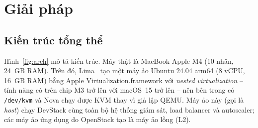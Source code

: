 \documentclass[runningheads]{llncs}
\newcommand{\code}[1]{\texttt{#1}}
\begin{document}
\section{Giải pháp}

\subsection{Kiến trúc tổng thể}

Hình~\ref{fig:arch} mô tả kiến trúc. Máy thật là MacBook Apple M4 (10 nhân, 24~GB RAM). Trên đó, Lima~\cite{lima} tạo một máy ảo Ubuntu 24.04 arm64 (8 vCPU, 16~GB RAM) bằng Apple Virtualization.framework với \emph{nested virtualization} – tính năng có trên chip M3 trở lên với macOS~15 trở lên – nên bên trong có \code{/dev/kvm} và Nova chạy được KVM thay vì giả lập QEMU. Máy ảo này (gọi là \emph{host}) chạy DevStack cùng toàn bộ hệ thống giám sát, load balancer và autoscaler; các máy ảo ứng dụng do OpenStack tạo là máy ảo lồng (L2).
\end{document}
